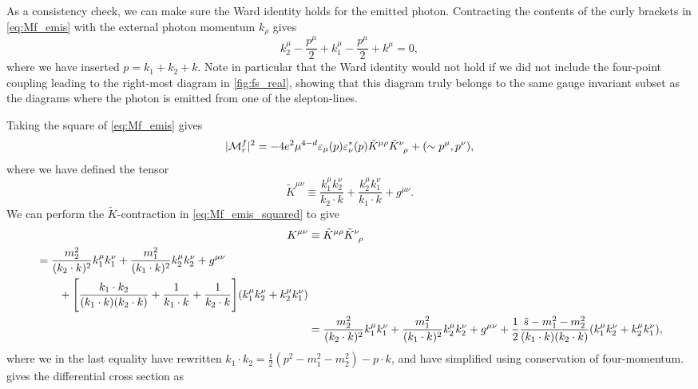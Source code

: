 As a consistency check, we can make sure the Ward identity holds for the emitted photon. Contracting the contents of the curly brackets in \cref{eq:Mf_emis} with the external photon momentum $k_\rho$ gives
\begin{equation}
    k_2^\mu - \frac{p^\mu}{2} + k_1^\mu - \frac{p^\mu}{2} + k^\mu
    = 0,
\end{equation}
where we have inserted $p=k_1+k_2+k$.
Note in particular that the Ward identity would not hold if we did not include the four-point coupling leading to the right-most diagram in \cref{fig:fs_real}, showing that this diagram truly belongs to the same gauge invariant subset as the diagrams where the photon is emitted from one of the slepton-lines.

Taking the square of \cref{eq:Mf_emis} gives
\begin{equation}
    \abs{\M^f_r}^2 = -4e^2\mu^{4-d} \eps_\mu(p) \eps_\nu^*(p) \tilde{K}^{\mu\rho} \tilde{K}\indices{^\nu_\rho} + (\sim p^\mu,p^\nu),
    \label{eq:Mf_emis_squared}
\end{equation}
where we have defined the tensor
\begin{equation}
    \tilde{K}^{\mu\nu} \equiv \frac{k_1^\mu k_2^\nu}{k_2 \cdot k} + \frac{k_2^\mu k_1^\nu}{k_1 \cdot k} + g^{\mu\nu}.
\end{equation}
We can perform the $\tilde{K}$-contraction in \cref{eq:Mf_emis_squared} to give
\begin{align}
    K^{\mu\nu} &\equiv \tilde{K}^{\mu\rho} \tilde{K}\indices{^\nu_\rho}
    \nonumber \\
    \begin{split}
        &=
        \frac{m_2^2}{(k_2\cdot k)^2}k_1^\mu k_1^\nu
        + \frac{m_1^2}{(k_1\cdot k)^2}k_2^\mu k_2^\nu
        + g^{\mu\nu}
        \\ &\qquad
        + \Biggl[ \frac{k_1\cdot k_2}{(k_1\cdot k)(k_2\cdot k)} + \frac{1}{k_1\cdot k} + \frac{1}{k_2\cdot k} \Biggr] (k_1^\mu k_2^\nu + k_2^\mu k_1^\nu)
    \end{split}
    \nonumber \\
    &=
    \frac{m_2^2}{(k_2\cdot k)^2}k_1^\mu k_1^\nu
    + \frac{m_1^2}{(k_1\cdot k)^2}k_2^\mu k_2^\nu
    + g^{\mu\nu}
    + \frac{1}{2} \frac{\shat-m_1^2-m_2^2}{(k_1\cdot k)(k_2\cdot k)} (k_1^\mu k_2^\nu + k_2^\mu k_1^\nu),
\end{align}
where we in the last equality have rewritten $k_1\cdot k_2 = \frac{1}{2}(p^2-m_1^2-m_2^2) - p\cdot k$, and have simplified using conservation of four-momentum.
 gives the differential cross section as
